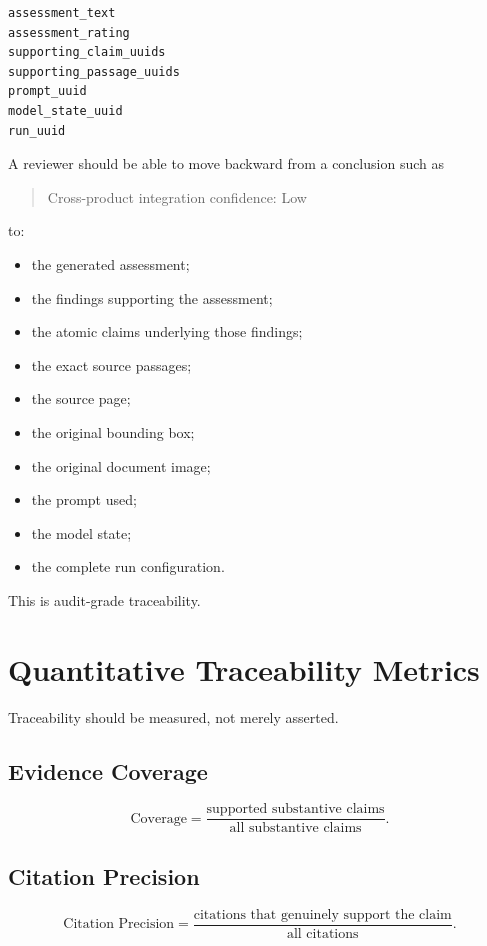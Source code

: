 \documentclass[11pt]{report}
\begin{document}
\begin{verbatim}
assessment_text
assessment_rating
supporting_claim_uuids
supporting_passage_uuids
prompt_uuid
model_state_uuid
run_uuid
\end{verbatim}

A reviewer should be able to move backward from a conclusion such as

\begin{quote}
Cross-product integration confidence: Low
\end{quote}

to:

\begin{itemize}
  \item the generated assessment;
  \item the findings supporting the assessment;
  \item the atomic claims underlying those findings;
  \item the exact source passages;
  \item the source page;
  \item the original bounding box;
  \item the original document image;
  \item the prompt used;
  \item the model state;
  \item the complete run configuration.
\end{itemize}

This is audit-grade traceability.

\chapter{Quantitative Traceability Metrics}

Traceability should be measured, not merely asserted.

\section{Evidence Coverage}

\[
\text{Coverage}
=
\frac{\text{supported substantive claims}}
     {\text{all substantive claims}}.
\]

\section{Citation Precision}

\[
\text{Citation Precision}
=
\frac{\text{citations that genuinely support the claim}}
     {\text{all citations}}.
\]
\end{document}
